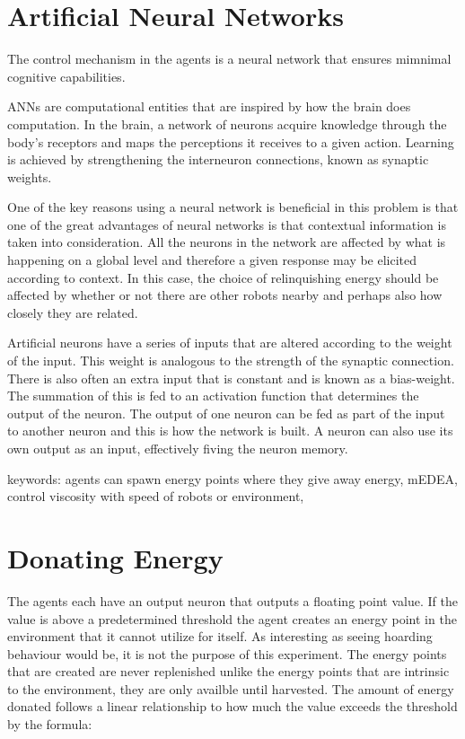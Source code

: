 \documentclass[a4paper]{book}
\begin{document}
\section{Artificial Neural Networks}

The control mechanism in the agents is a neural network that ensures mimnimal cognitive capabilities.

ANNs are computational entities that are inspired by how the brain does computation. 
In the brain, a network of neurons acquire knowledge through the body's receptors and maps the perceptions it receives to a given action. 
Learning is achieved by strengthening the interneuron connections, known as synaptic weights. \cite{haykin_neural_1994} 

One of the key reasons using a neural network is beneficial in this problem is that one of the great advantages of neural networks is that contextual information is taken into consideration. 
All the neurons in the network are affected by what is happening on a global level and therefore a given response may be elicited according to context.
In this case, the choice of relinquishing energy should be affected by whether or not there are other robots nearby and perhaps also how closely they are related.

Artificial neurons have a series of inputs that are altered according to the weight of the input. This weight is analogous to the strength of the synaptic connection.
There is also often an extra input that is constant and is known as a bias-weight. The summation of this is fed to an activation function that determines the output of the neuron. The output of one neuron can be fed as part of the input to another neuron and this is how the network is built. A neuron can also use its own output as an input, effectively fiving the neuron memory. 


keywords: agents can spawn energy points where they give away energy, mEDEA, control viscosity with speed of robots or environment,

\section{Donating Energy}
The agents each have an output neuron that outputs a floating point value. If the value is above a predetermined threshold the agent creates an energy point in the environment that 
it cannot utilize for itself. As interesting as seeing hoarding behaviour would be, it is not the purpose of this experiment. The energy points that are created are never replenished 
unlike the energy points that are intrinsic to the environment, they are only availble until harvested. The amount of energy donated follows a linear relationship to how much the 
value exceeds the threshold by the formula:
\end{document}
